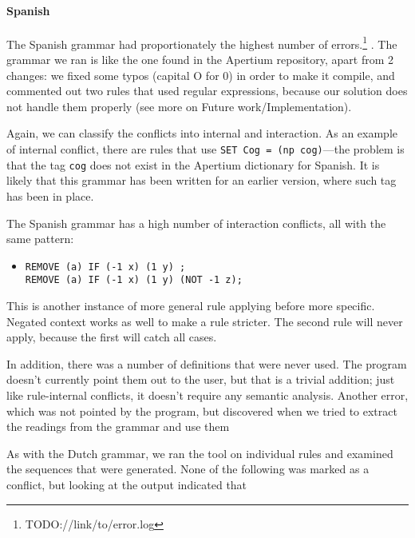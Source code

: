 \paragraph{Spanish} The Spanish grammar had proportionately the highest number of errors.\footnote{TODO://link/to/error.log} .  The grammar we ran is like the one found in the Apertium repository, apart from 2 changes: we fixed some typos (capital O for 0) in order to make it compile, and commented out two rules that used regular expressions, because our solution does not handle them properly (see more on Future work/Implementation).

Again, we can classify the conflicts into internal and interaction. As an example of internal conflict, there are  rules that use \texttt{SET Cog = (np cog)}---the problem is that the tag \texttt{cog} does not exist in the Apertium dictionary for Spanish. It is likely that this grammar has been written for an earlier version, where such tag has been in place.




The Spanish grammar has a high number of interaction conflicts, all with the same pattern:

\begin{itemize}
\item[] 
\begin{verbatim}REMOVE (a) IF (-1 x) (1 y) ;
REMOVE (a) IF (-1 x) (1 y) (NOT -1 z);
\end{verbatim}
\end{itemize}


This is another instance of more general rule applying before more specific. Negated context works as well to make a rule stricter. The second rule will never apply, because the first will catch all cases.

In addition, there was a number of definitions that were never used. The program doesn't currently point them out to the user, but that is a trivial addition; just like rule-internal conflicts, it doesn't require any semantic analysis. 
Another error, which was not pointed by the program, but discovered when we tried to extract the readings from the grammar and use them 



As with the Dutch grammar, we ran the tool on individual rules and examined the sequences that were generated. None of the following was marked as a conflict, but looking at the output indicated that 

